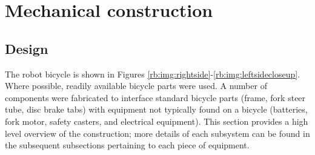 \section{Mechanical construction} \label{rb:sec:mec}
\subsection{Design} \label{rb:subsec:mecdesign}
The robot bicycle is shown in Figures
\ref{rb:img:rightside}-\ref{rb:img:leftsidecloseup}. Where possible, readily
available bicycle parts were used. A number of components were fabricated to
interface standard bicycle parts (frame, fork steer tube, disc brake tabs) with
equipment not typically found on a bicycle (batteries, fork motor, safety
casters, and electrical equipment). This section provides a high level overview
of the construction; more details of each subsystem can be found in the
subsequent subsections pertaining to each piece of equipment.

